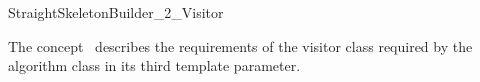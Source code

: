 
\begin{ccRefConcept}{StraightSkeletonBuilder_2_Visitor}



\ccDefinition

The concept \ccRefName\ describes the requirements of the visitor class required by the algorithm class  in its third template parameter.

\ccTypes
  \ccGlue

\ccCreation
{}  %

\ccOperations


\end{ccRefConcept}
